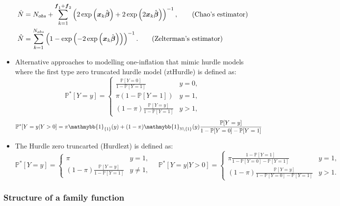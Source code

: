 \documentclass[
]{jss}
\newcommand{\1}{\mathmybb{1}} \newcommand{\bx}{\boldsymbol{x}}
\begin{document}
\begin{itemize}
\begin{align}
        \hat{N} &= N_{obs}+
        \sum_{k=1}^{\boldsymbol{f}_{1}+\boldsymbol{f}_{2}}
        \left(2\exp\left(\boldsymbol{x}_{k}\hat{\boldsymbol{\beta}}\right)+
        2\exp\left(2\boldsymbol{x}_{k}\hat{\boldsymbol{\beta}}\right)\right)^{-1},
        \tag{\text{Chao's estimator}}\\
        \hat{N}&=\sum_{k=1}^{N_{obs}}
        \left(1-\exp\left(-2\exp\left(\boldsymbol{x}_{k}\hat{\boldsymbol{\beta}}\right)\right)\right)^{-1}.
        \tag{\text{Zelterman's estimator}}
    \end{align}
    \item Alternative approaches to modelling one-inflation that mimic hurdle models where the first type zero truncated hurdle model (ztHurdle) is defined as:
    \begin{equation*}
        \mathbb{P}^{\ast}[Y=y]=\begin{cases}
        \frac{\mathbb{P}[Y=0]}{1-\mathbb{P}[Y=1]} & y=0, \\
        \pi(1-\mathbb{P}[Y=1]) & y=1, \\
        (1-\pi) \frac{\mathbb{P}[Y=y]}{1-\mathbb{P}[Y=1]} & y>1,
        \end{cases}
    \end{equation*}
    \begin{equation*}
        \mathbb{P}^{\ast}[Y=y|Y>0]=\pi\mathmybb{1}_{\{1\}}(y)+
        (1-\pi)\mathmybb{1}_{\mathbb{N}\setminus\{1\}}(y)\frac{\mathbb{P}[Y=y]}{1-\mathbb{P}[Y=0]-\mathbb{P}[Y=1]}
    \end{equation*}
    \item The Hurdle zero truncarted (Hurdlezt) is defined as:
    \begin{equation*}
        \mathbb{P}^{\ast}[Y=y]=\begin{cases}
        \pi & y=1, \\
        (1-\pi) \frac{\mathbb{P}[Y=y]}{1-\mathbb{P}[Y=1]} & y\neq1,
        \end{cases}
        \quad
        \mathbb{P}^{\ast}[Y=y|Y>0]=\begin{cases}
            \pi\frac{1-\mathbb{P}[Y=1]}{1-\mathbb{P}[Y=0]-\mathbb{P}[Y=1]} & y=1,\\
            (1-\pi)\frac{\mathbb{P}[Y=y]}{1-\mathbb{P}[Y=0]-\mathbb{P}[Y=1]} & y>1.
        \end{cases}
    \end{equation*}
\end{itemize}

\hypertarget{structure-of-a-family-function}{%
\subsubsection{Structure of a family
function}\label{structure-of-a-family-function}}
\end{document}

